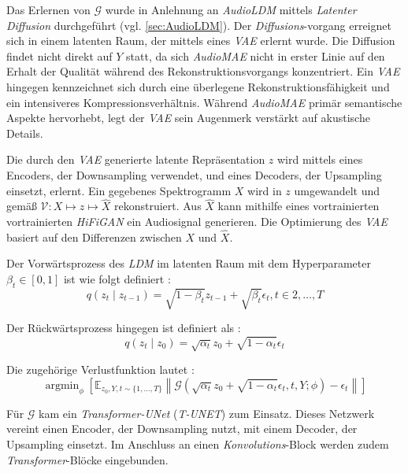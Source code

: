 \documentclass[
  a4paper,  %
  twoside,  %
  bibliography=totoc,
  headsepline,
  cleardoublepage=empty,
  parskip=half,
  draft=false
]{scrbook}
\begin{document}
Das Erlernen von $\mathcal{G}$ wurde in Anlehnung an \emph{AudioLDM} \cite{liu_audioldm_2023} mittels \emph{Latenter Diffusion} \cite{rombach_high-resolution_2022} durchgeführt (vgl. \ref{sec:AudioLDM}). Der \emph{Diffusions}-vorgang erreignet sich in einem latenten Raum, der mittels eines \emph{VAE} \cite{kingma_auto-encoding_2022} erlernt wurde. Die Diffusion findet nicht direkt auf $Y$ statt, da sich \emph{AudioMAE} nicht in erster Linie auf den Erhalt der Qualität während des Rekonstruktionsvorgangs konzentriert. Ein \emph{VAE} hingegen kennzeichnet sich durch eine überlegene Rekonstruktionsfähigkeit und ein intensiveres Kompressionsverhältnis. Während \emph{AudioMAE} primär semantische Aspekte hervorhebt, legt der \emph{VAE} sein Augenmerk verstärkt auf akustische Details. \cite{liu_audioldm2_2023}

Die durch den \emph{VAE} generierte latente Repräsentation $z$ wird mittels eines Encoders, der Downsampling verwendet, und eines Decoders, der Upsampling einsetzt, erlernt. Ein gegebenes Spektrogramm $X$ wird in $z$ umgewandelt und gemäß $\mathcal{V}: X \mapsto z \mapsto \hat{X}$ rekonstruiert. Aus $\hat{X}$ kann mithilfe eines vortrainierten vortrainierten \emph{HiFiGAN} \cite{kong_hifi-gan_2020} ein Audiosignal generieren. Die Optimierung des \emph{VAE} basiert auf den Differenzen zwischen $X$ und $\hat{X}$. \cite{liu_audioldm2_2023}

Der Vorwärtsprozess des \emph{LDM} im latenten Raum mit dem Hyperparameter $\beta_t \in[0,1]$ ist wie folgt definiert \cite{liu_audioldm2_2023}:
\begin{equation}
    q\left(z_t \mid z_{t-1}\right)=\sqrt{1-\beta_t} z_{t-1}+\sqrt{\beta_t} \epsilon_t, t \in 2, \ldots, T
\end{equation}

Der Rückwärtsprozess hingegen ist definiert als \cite{liu_audioldm2_2023}:
\begin{equation}
q\left(z_t \mid z_0\right)=\sqrt{\alpha_t} z_0+\sqrt{1-\alpha_t} \epsilon_t
\end{equation}

Die zugehörige Verlustfunktion lautet \cite{liu_audioldm2_2023}:
\begin{equation}
\operatorname{argmin}_\phi\left[\mathbb{E}_{z_0, Y, t \sim\{1, \ldots, T\}}\left\|\mathcal{G}\left(\sqrt{\alpha_t} z_0+\sqrt{1-\alpha_t} \epsilon_t, t, Y ; \phi\right)-\epsilon_t\right\|\right]
\end{equation}

Für $\mathcal{G}$ kam ein \emph{Transformer-UNet} (\emph{T-UNET}) zum Einsatz. Dieses Netzwerk vereint einen Encoder, der Downsampling nutzt, mit einem Decoder, der Upsampling einsetzt. Im Anschluss an einen \emph{Konvolutions}-Block werden zudem \emph{Transformer}-Blöcke eingebunden. \cite{liu_audioldm2_2023}
\end{document}
